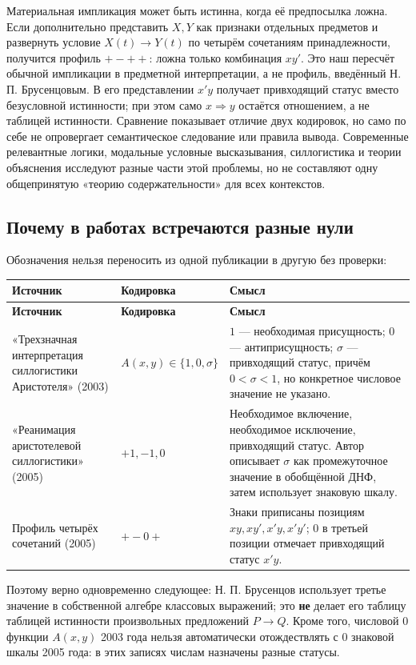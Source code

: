 \documentclass[12pt,a4paper]{article}
\begin{document}
Материальная импликация может быть истинна, когда её предпосылка ложна. Если дополнительно представить \(X,Y\) как признаки отдельных предметов и развернуть условие \(X(t)\to Y(t)\) по четырём сочетаниям принадлежности, получится профиль \(+-++\): ложна только комбинация \(xy'\). Это наш пересчёт обычной импликации в предметной интерпретации, а не профиль, введённый Н. П. Брусенцовым. В его представлении \(x'y\) получает привходящий статус вместо безусловной истинности; при этом само \(x\Rightarrow y\) остаётся отношением, а не таблицей истинности. Сравнение показывает отличие двух кодировок, но само по себе не опровергает семантическое следование или правила вывода. Современные релевантные логики, модальные условные высказывания, силлогистика и теории объяснения исследуют разные части этой проблемы, но не составляют одну общепринятую «теорию содержательности» для всех контекстов.

\subsection{Почему в работах встречаются разные нули}

Обозначения нельзя переносить из одной публикации в другую без проверки:

\begin{longtable}{P{0.260\textwidth}P{0.300\textwidth}P{0.360\textwidth}}
\toprule
\textbf{Источник} & \textbf{Кодировка} & \textbf{Смысл} \\
\midrule
\endfirsthead
\toprule
\textbf{Источник} & \textbf{Кодировка} & \textbf{Смысл} \\
\midrule
\endhead
«Трехзначная интерпретация силлогистики Аристотеля» (2003) & \(A(x,y)\in\{1,0,\sigma\}\) & \(1\) — необходимая присущность; \(0\) — антиприсущность; \(\sigma\) — привходящий статус, причём \(0<\sigma<1\), но конкретное числовое значение не указано. \\
«Реанимация аристотелевой силлогистики» (2005) & \(+1,-1,0\) & Необходимое включение, необходимое исключение, привходящий статус. Автор описывает \(\sigma\) как промежуточное значение в обобщённой ДНФ, затем использует знаковую шкалу. \\
Профиль четырёх сочетаний (2005) & \(+-0+\) & Знаки приписаны позициям \(xy,xy',x'y,x'y'\); \(0\) в третьей позиции отмечает привходящий статус \(x'y\). \\
\bottomrule
\end{longtable}

Поэтому верно одновременно следующее: Н. П. Брусенцов использует третье значение в собственной алгебре классовых выражений; это \textbf{не} делает его таблицу таблицей истинности произвольных предложений \(P\to Q\). Кроме того, числовой \(0\) функции \(A(x,y)\) 2003 года нельзя автоматически отождествлять с \(0\) знаковой шкалы 2005 года: в этих записях числам назначены разные статусы.
\end{document}
